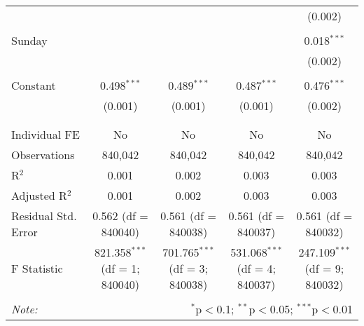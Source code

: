 \documentclass[
]{article}
\begin{document}
\begin{table}[!htbp]
{\begin{tabular}{@{\extracolsep{5pt}}lcccc}
  &  &  &  & (0.002) \\ 
  & & & & \\ 
 Sunday &  &  &  & 0.018$^{***}$ \\ 
  &  &  &  & (0.002) \\ 
  & & & & \\ 
 Constant & 0.498$^{***}$ & 0.489$^{***}$ & 0.487$^{***}$ & 0.476$^{***}$ \\ 
  & (0.001) & (0.001) & (0.001) & (0.002) \\ 
  & & & & \\ 
\hline \\[-1.8ex] 
Individual FE & No & No & No & No \\ 
Observations & 840,042 & 840,042 & 840,042 & 840,042 \\ 
R$^{2}$ & 0.001 & 0.002 & 0.003 & 0.003 \\ 
Adjusted R$^{2}$ & 0.001 & 0.002 & 0.003 & 0.003 \\ 
Residual Std. Error & 0.562 (df = 840040) & 0.561 (df = 840038) & 0.561 (df = 840037) & 0.561 (df = 840032) \\ 
F Statistic & 821.358$^{***}$ (df = 1; 840040) & 701.765$^{***}$ (df = 3; 840038) & 531.068$^{***}$ (df = 4; 840037) & 247.109$^{***}$ (df = 9; 840032) \\ 
\hline 
\hline \\[-1.8ex] 
\textit{Note:}  & \multicolumn{4}{r}{$^{*}$p$<$0.1; $^{**}$p$<$0.05; $^{***}$p$<$0.01} \\ 
\end{tabular}
} 
\end{table} 
\newpage
\end{document}
